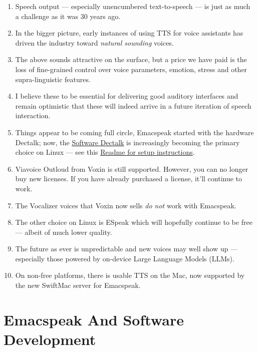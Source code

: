 \documentclass[11pt]{article}
\begin{document}
\begin{enumerate}
\item Speech output --- especially unencumbered text-to-speech --- is just
as much a challenge as it was 30 years ago.
\item In the bigger picture, early instances of using TTS for voice
assistants has driven the industry toward \emph{natural sounding} voices.
\item The above sounds attractive on the surface, but a price we have
paid is the  loss of fine-grained control over voice parameters,
emotion, stress and other supra-linguistic features.
\item I  believe  these to be essential for delivering
good auditory interfaces and   remain optimistic that
these will indeed arrive in a future iteration of speech
interaction.
\item Things appear to be coming full circle, Emacspeak started with
the hardware Dectalk; now, the \href{https://github.com/dectalk/dectalk.git}{Software Dectalk} is increasingly
becoming the primary choice on Linux --- see this  \href{https://raw.githubusercontent.com/tvraman/emacspeak/master/servers/software-dtk/Readme.org}{Readme for setup instructions}.
\item Viavoice Outloud from Voxin is still supported.  However,
you can no longer buy new licenses. If you have already purchased
a license, it'll
continue to work.
\item The  Vocalizer voices that Voxin now sells \emph{do not} work with Emacspeak.
\item The  other choice on Linux is ESpeak which will hopefully
continue to be free --- albeit of much lower quality.
\item The future as ever is unpredictable and new voices may well show
up --- especially those powered by on-device Large Language
Models (LLMs).

\item On non-free platforms, there is usable TTS on the Mac, now
supported by the new SwiftMac server for Emacspeak.
\end{enumerate}
\section{Emacspeak And Software Development}
\label{sec:orgb1b0a62}
\end{document}
